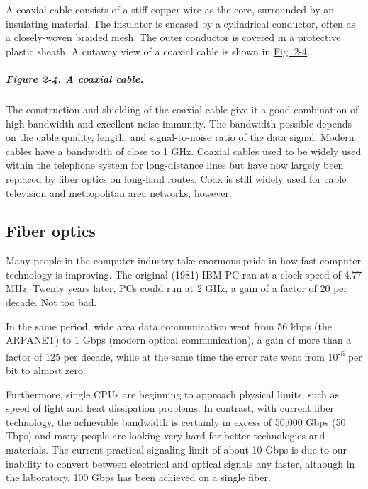 A coaxial cable consists of a stiff copper wire as the core, surrounded
by an insulating material. The insulator is encased by a cylindrical
conductor, often as a closely-woven braided mesh. The outer conductor is
covered in a protective plastic sheath. A cutaway view of a coaxial
cable is shown in
\protect\hyperlink{0130661023_ch02lev1sec2.htmlux5cux23ch02fig04}{Fig.
2-4}.

\subparagraph[Figure 2-4. A coaxial
cable.]{\texorpdfstring{\protect\hypertarget{0130661023_ch02lev1sec2.htmlux5cux23ch02fig04}{}{}Figure
2-4. A coaxial cable.}{Figure 2-4. A coaxial cable.}}


The construction and shielding of the coaxial cable give it a good
combination of high bandwidth and excellent noise immunity. The
bandwidth possible depends on the cable quality, length, and
signal-to-noise ratio of the data signal. Modern cables have a bandwidth
of close to 1 GHz. Coaxial cables used to be widely used within the
telephone system for long-distance lines but have now largely been
replaced by fiber optics on long-haul routes. Coax is still widely used
for cable television and metropolitan area networks, however.

\protect\hypertarget{0130661023_ch02lev1sec2.htmlux5cux23ch02lev2sec7}{}{}

\subsection{Fiber optics}

Many people in the computer industry take enormous pride in how fast
computer technology is improving. The original (1981) IBM PC ran at a
clock speed of 4.77 MHz. Twenty years later, PCs could run at 2 GHz, a
gain of a factor of 20 per decade. Not too bad.

In the same period, wide area data communication went from 56 kbps (the
ARPANET) to 1 Gbps (modern optical communication), a gain of more than a
factor of 125 per decade, while at the same time the error rate went
from 10\textsuperscript{-5} per bit to almost zero.

Furthermore, single CPUs are beginning to approach physical limits, such
as speed of light and heat dissipation problems. In contrast, with
{current} fiber technology, the achievable bandwidth is certainly in
excess of 50,000 Gbps (50 Tbps) and many people are looking very hard
for better technologies and materials. The current practical signaling
limit of about 10 Gbps is due to our inability to convert between
electrical and optical signals any faster, although in the laboratory,
100 Gbps has been achieved on a single fiber.

